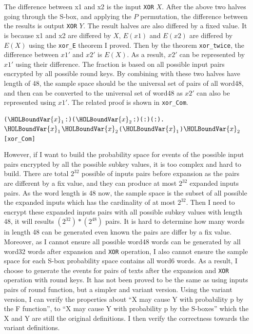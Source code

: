 \documentclass{article}
\begin{document}
The difference between x1 and x2 is the input \verb|XOR| $X$. After the above two halves going through the S-box, and applying the
$P$ permutation, the difference between the results is output \verb|XOR| $Y$. The result halves are also differed by a fixed
value. It is because x1 and x2 are differed by $X$, $E(x1)$ and $E(x2)$ are differed by $E(X)$ using
the \verb|xor_E| theorem I proved. Then by the theorem \verb|xor_twice|, the difference between $x1'$ and $x2'$ is $E(X)$. As a
result, $x2'$ can be represented by $x1'$ using their difference.
The fraction is based on all possible input pairs encrypted by all possible round keys.
By combining with these two halves have length of 48, the sample
space should be the universal set of pairs of all word48, and then can be converted to the universal set of word48 as $x2'$
can also be represented using $x1'$.  The related proof is shown in \verb|xor_Com|.

\begin{alltt}
  \HOLTokenTurnstile{} \HOLSymConst{\HOLTokenForall{}}(\ensuremath{\HOLBoundVar{x}\sb{\mathrm{1}}} :) (\ensuremath{\HOLBoundVar{x}\sb{\mathrm{2}}} :) ( :) ( :).
     \ensuremath{\HOLBoundVar{x}\sb{\mathrm{1}}} \HOLSymConst{\HOLTokenEor{}} \ensuremath{\HOLBoundVar{x}\sb{\mathrm{2}}} \HOLSymConst{=}  \HOLSymConst{\HOLTokenImp{}} ( \ensuremath{\HOLBoundVar{x}\sb{\mathrm{1}}} \HOLSymConst{\HOLTokenEor{}} ) \HOLSymConst{\HOLTokenEor{}}  \ensuremath{\HOLBoundVar{x}\sb{\mathrm{2}}} \HOLSymConst{\HOLTokenEor{}}  \HOLSymConst{=}  \hfill{[xor_Com]}
\end{alltt}

However, if I want to build the probability space for events of the possible input pairs encrypted by all the possible
subkey values, it is too complex and hard to build. There are total $2^{32}$ possible of inputs pairs before expansion as the pairs
are different by a fix value, and they can produce at most $2^{32}$ expanded inputs pairs. As the word length is 48 now, the sample
space is the subset of all possible the expanded inputs which has the cardinality of at most $2^{32}$. Then I need to encrypt these
expanded inputs pairs with all possible subkey values with length 48, it will results $(2^{32})*(2^{48})$ pairs. It is hard to
determine how many words in length 48 can be generated even known the pairs are differ by a fix value. Moreover, as I cannot ensure
all possible word48 words can be generated by all word32 words after expansion and \verb|XOR| operation, I also cannot ensure the sample
space for each S-box probability space contains all word6 words. As a result, I choose to generate the events for pairs of texts after
the expansion and \verb|XOR| operation with round keys. It has not been proved to be the same as using inputs pairs of round function, but a
simpler and variant version. Using the variant version, I can verify the properties about ``X may cause Y with probability p by the F function'',
to ``X may cause Y with probability p by the S-boxes'' which the X and Y are still the original definitions.
I then verify the correctness towards the variant definitions.
\end{document}
